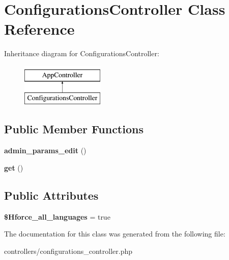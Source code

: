 \hypertarget{class_configurations_controller}{
\section{\-Configurations\-Controller \-Class \-Reference}
\label{class_configurations_controller}
}
\-Inheritance diagram for \-Configurations\-Controller\-:\begin{figure}[H]
\begin{center}
\leavevmode
\includegraphics[height=2.000000cm]{class_configurations_controller}
\end{center}
\end{figure}
\subsection*{\-Public \-Member \-Functions}
\begin{DoxyCompactItemize}
\item 
\hypertarget{class_configurations_controller_afb65ad455f51060ef8a7b922cffca762}{
{\bfseries admin\-\_\-params\-\_\-edit} ()}
\label{class_configurations_controller_afb65ad455f51060ef8a7b922cffca762}

\item 
\hypertarget{class_configurations_controller_acc11d254295af530a6142b9f1d0f370a}{
{\bfseries get} ()}
\label{class_configurations_controller_acc11d254295af530a6142b9f1d0f370a}

\end{DoxyCompactItemize}
\subsection*{\-Public \-Attributes}
\begin{DoxyCompactItemize}
\item 
\hypertarget{class_configurations_controller_ab998262610b65039bd3c54de870c5b39}{
{\bfseries \$\-Hforce\-\_\-all\-\_\-languages} = true}
\label{class_configurations_controller_ab998262610b65039bd3c54de870c5b39}

\end{DoxyCompactItemize}


\-The documentation for this class was generated from the following file\-:\begin{DoxyCompactItemize}
\item 
controllers/configurations\-\_\-controller.\-php\end{DoxyCompactItemize}
